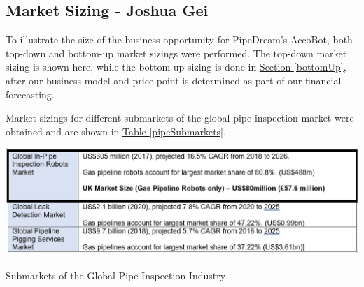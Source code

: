 \documentclass[11pt]{article}		%
\newcommand{\supercite}[1]{\textsuperscript{\cite{#1}}}		%
\newcommand{\tableref}[1]{\hyperref[#1]{Table \ref*{#1}}}     %
\newcommand{\sectref}[1]{\hyperref[#1]{Section \ref*{#1}}}     %
\begin{document}
        \subsection[Market Sizing]{Market Sizing - Joshua Gei}
        To illustrate the size of the business opportunity for PipeDream’s AccoBot, both top-down and bottom-up market sizings were performed. The top-down market sizing is shown here, while the bottom-up sizing is done in \sectref{bottomUp}, after our business model and price point is determined as part of our financial forecasting. 
        
        Market sizings for different submarkets of the global pipe inspection market were obtained and are shown in \tableref{pipeSubmarkets}. 
    	\begin{table}[h]
			\centering
			\includegraphics[width=\textwidth]{Market Sizing.jpg}
			\caption{Submarkets of the Global Pipe Inspection Industry\supercite{2g_robotics}\supercite{2g_robotics}\supercite{2g_robotics}}
			\label{pipeSubmarkets}
 		\end{table}
 	\vspace{-0.5cm}
        
\end{document}
